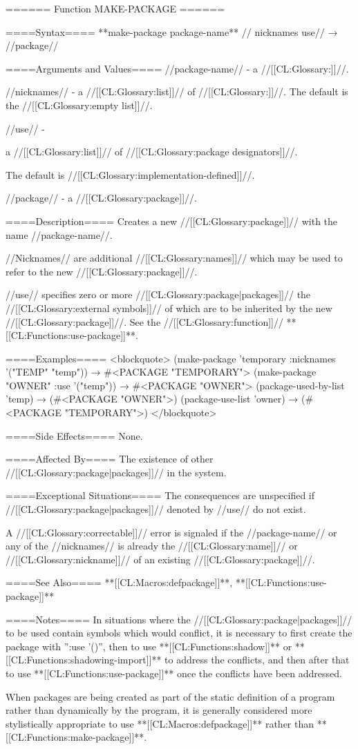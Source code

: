 ====== Function MAKE-PACKAGE ======

====Syntax====
**make-package {package-name** //\key} nicknames use// → //package//

====Arguments and Values====
//package-name// - a //[[CL:Glossary:\packagenamedesignator]]//.

//nicknames// - a //[[CL:Glossary:list]]// of //[[CL:Glossary:\packagenamedesignators]]//. The default is the //[[CL:Glossary:empty list]]//.

//use// -

a //[[CL:Glossary:list]]// of //[[CL:Glossary:package designators]]//.

The default is //[[CL:Glossary:implementation-defined]]//.

//package// - a //[[CL:Glossary:package]]//.

====Description====
Creates a new //[[CL:Glossary:package]]// with the name //package-name//.

//Nicknames// are additional //[[CL:Glossary:names]]// which may be used to refer to the new //[[CL:Glossary:package]]//.

//use// specifies zero or more //[[CL:Glossary:package|packages]]// the //[[CL:Glossary:external symbols]]// of which are to be inherited by the new //[[CL:Glossary:package]]//. See the //[[CL:Glossary:function]]// **[[CL:Functions:use-package]]**.

====Examples====
<blockquote> (make-package 'temporary :nicknames '("TEMP" "temp")) → #<PACKAGE "TEMPORARY"> (make-package "OWNER" :use '("temp")) → #<PACKAGE "OWNER"> (package-used-by-list 'temp) → (#<PACKAGE "OWNER">) (package-use-list 'owner) → (#<PACKAGE "TEMPORARY">) </blockquote>

====Side Effects====
None.

====Affected By====
The existence of other //[[CL:Glossary:package|packages]]// in the system.

====Exceptional Situations====
The consequences are unspecified if //[[CL:Glossary:package|packages]]// denoted by //use// do not exist.

A //[[CL:Glossary:correctable]]// error is signaled if the //package-name// or any of the //nicknames// is already the //[[CL:Glossary:name]]// or //[[CL:Glossary:nickname]]// of an existing //[[CL:Glossary:package]]//.

====See Also====
**[[CL:Macros:defpackage]]**, **[[CL:Functions:use-package]]**

====Notes====
In situations where the //[[CL:Glossary:package|packages]]// to be used contain symbols which would conflict, it is necessary to first create the package with '':use '()'', then to use **[[CL:Functions:shadow]]** or **[[CL:Functions:shadowing-import]]** to address the conflicts, and then after that to use **[[CL:Functions:use-package]]** once the conflicts have been addressed.

When packages are being created as part of the static definition of a program rather than dynamically by the program, it is generally considered more stylistically appropriate to use **[[CL:Macros:defpackage]]** rather than **[[CL:Functions:make-package]]**.

 
